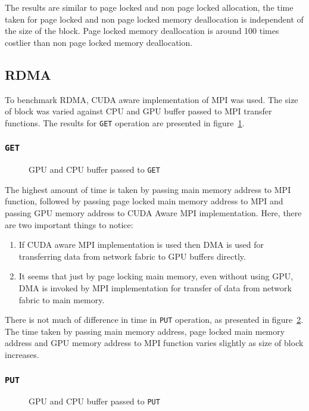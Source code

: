 The results are similar to page locked and non page locked allocation, the time
taken for page locked and non page locked memory deallocation is independent of
the size of the block. Page locked memory deallocation is around 100 times costlier
than non page locked memory deallocation.

\subsection{RDMA}
To benchmark RDMA, CUDA aware implementation of MPI was used. The size of block
was varied against CPU and GPU buffer passed to MPI transfer functions. The results
for \texttt{GET} operation are presented in figure~\ref{fig:mempin_rdma_get}.

\subsubsection{\texttt{GET}}
\begin{figure}[h]
  
  \caption{GPU and CPU buffer passed to \texttt{GET}}
  \label{fig:mempin_rdma_get}
\end{figure}


The highest amount of time is taken by passing main memory address to MPI function,
followed by passing page locked main memory address to MPI and passing GPU memory
address to CUDA Aware MPI implementation. Here, there are two important things to
notice:
\begin{enumerate}
\item If CUDA aware MPI implementation is used then DMA is used for transferring
  data from network fabric to GPU buffers directly.
\item It seems that just by page locking main memory, even without using GPU, DMA
  is invoked by MPI implementation for transfer of data from network fabric to
  main memory.
\end{enumerate}

There is not much of difference in time in \texttt{PUT} operation, as presented
in figure~\ref{fig:mempin_rdma_put}. The time taken by passing main memory address,
page locked main memory address and GPU memory address to MPI function varies slightly
as size of block increases.

\subsubsection{\texttt{PUT}}
\begin{figure}[h]
  
  \caption{GPU and CPU buffer passed to \texttt{PUT}}
  \label{fig:mempin_rdma_put}
\end{figure}

